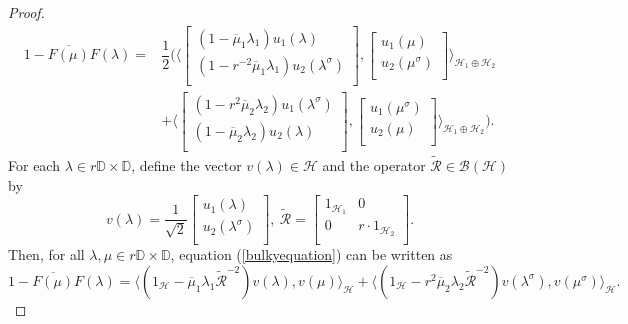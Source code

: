\documentclass[10pt,a4paper]{amsart}
\begin{document}
\begin{proof}
\begin{align}
1-\overline{F(\mu)}F(\lambda) =& \dfrac{1}{2}\Bigg(\Bigg\langle
\begin{bmatrix}
	(1-\overline\mu_{1}\lambda_{1})u_{1}(\lambda) \\
	(1-r^{-2}\overline\mu_{1}\lambda_{1})u_{2}(\lambda^{\sigma}) \nonumber \\
\end{bmatrix},
\begin{bmatrix}
           u_{1}(\mu) \\
           u_{2}(\mu^{\sigma}) \\
\end{bmatrix}\Bigg\rangle_{\mathcal{H}_{1}\oplus \mathcal{H}_{2}}\\
& + \Bigg\langle
\begin{bmatrix}
	(1-r^{2}\overline\mu_{2}\lambda_{2})u_{1}({\lambda^{\sigma}}) \\
	(1-\overline\mu_{2}\lambda_{2})u_{2}({\lambda}) \\
\end{bmatrix},
\begin{bmatrix}
	u_{1}({\mu}^{\sigma}) \\
	u_{2}({\mu}) \\
\end{bmatrix}\Bigg\rangle_{\mathcal{H}_{1}\oplus \mathcal{H}_{2}}\Bigg). \label{bulkyequation}
\end{align}
For each $\lambda \in r\mathbb{D}\times\mathbb{D}$, define
the vector $v(\lambda)\in\mathcal{H}$ and the operator $\widetilde{\mathcal{R}} \in \mathcal{B(H)}$ by
\begin{equation}\nonumber
v({\lambda}) = \dfrac{1}{\sqrt{2}}
\begin{bmatrix}
	u_{1}({\lambda}) \\
	u_{2}({\lambda^{\sigma}}) \\
\end{bmatrix},~
\widetilde{\mathcal{R}} = 
\begin{bmatrix}
	1_{\mathcal{H}_1}   	& 0                \\
	0 		& r\cdot 1_{\mathcal{H}_2}  	\\
\end{bmatrix}.
\end{equation}
Then, for all $\lambda,\mu \in r\mathbb{D}\times\mathbb{D}$, equation (\ref{bulkyequation}) can be written as
\begin{equation}\label{averagedequations}
1-\overline{F(\mu)}F(\lambda) = \Big\langle(1_{\mathcal{H}}-\overline{\mu}_{1}\lambda_{1}\widetilde{\mathcal{R}}^{-2})v({\lambda}),v({\mu})\Big\rangle_{\mathcal{H}}+\Big\langle(1_{\mathcal{H}}-r^{2}\overline{\mu}_{2}\lambda_{2}\widetilde{\mathcal{R}}^{-2})v({\lambda}^{\sigma}),v(\mu^{\sigma})\Big\rangle_{\mathcal{H}}.

\end{equation}
\end{proof}
\end{document}
